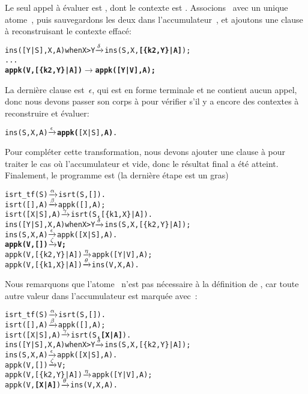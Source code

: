Le seul appel à évaluer est , dont le contexte est
\erlcode{[Y|\textvisiblespace]}. Associons~ avec un unique
atome~, puis sauvegardons les deux dans
l'accumulateur~, et ajoutons une clause à
 reconstruisant le contexte effacé:
\begin{alltt}
ins([Y|S],X,A) when X > Y \(\smashedrightarrow{\delta}\) ins(S,X,\textbf{[\{k2,Y\}|A]});
...
\textbf{appk(V,[\{k2,Y\}|A])        \(\rightarrow\) appk([Y|V],A);}
\end{alltt}
La dernière clause est~\(\epsilon\), qui est en forme terminale et ne
contient aucun appel, donc nous devons passer son corps à 
 pour vérifier s'il y a encore des contextes à
reconstruire et évaluer:
\begin{alltt}
ins(    S,X,A)            \(\smashedrightarrow{\epsilon}\) \textbf{appk(}[X|S],\textbf{A)}.
\end{alltt}
Pour compléter cette transformation, nous devons ajouter une clause à
 pour traiter le cas où l'accumulateur et vide, donc
le résultat final a été atteint. Finalement, le programme est (la
dernière étape est un gras)\label{isrt_tf_appk}
\begin{alltt}
isrt_tf(S)                \(\smashedrightarrow{\alpha}\) isrt(S,[]).
isrt(   [],A)             \(\smashedrightarrow{\beta}\) appk([],A);
isrt([X|S],A)             \(\smashedrightarrow{\gamma}\) isrt(S,[\{k1,X\}|A]).
ins([Y|S],X,A) when X > Y \(\smashedrightarrow{\delta}\) ins(S,X,[\{k2,Y\}|A]);
ins(    S,X,A)            \(\smashedrightarrow{\epsilon}\) appk([X|S],A).
\textbf{appk(V,        [])        \(\smashedrightarrow{\zeta}\) V;}
appk(V,[\{k2,Y\}|A])        \(\smashedrightarrow{\eta}\) appk([Y|V],A);
appk(V,[\{k1,X\}|A])        \(\smashedrightarrow{\theta}\) ins(V,X,A).
\end{alltt}
Nous remarquons que l'atome~ n'est pas nécessaire à la
définition de , car toute autre valeur dans
l'accumulateur est marquée avec~:
\begin{alltt}
isrt_tf(S)                \(\smashedrightarrow{\alpha}\) isrt(S,[]).
isrt(   [],A)             \(\smashedrightarrow{\beta}\) appk([],A);
isrt([X|S],A)             \(\smashedrightarrow{\gamma}\) isrt(S,\textbf{[X|A]}).\hfill% \emph{Ici}
ins([Y|S],X,A) when X > Y \(\smashedrightarrow{\delta}\) ins(S,X,[\{k2,Y\}|A]);
ins(    S,X,A)            \(\smashedrightarrow{\epsilon}\) appk([X|S],A).
appk(V,        [])        \(\smashedrightarrow{\zeta}\) V;
appk(V,[\{k2,Y\}|A])        \(\smashedrightarrow{\eta}\) appk([Y|V],A);
appk(V,     \textbf{[X|A]})        \(\smashedrightarrow{\theta}\) ins(V,X,A).\hfill% \emph{et là}
\end{alltt}
